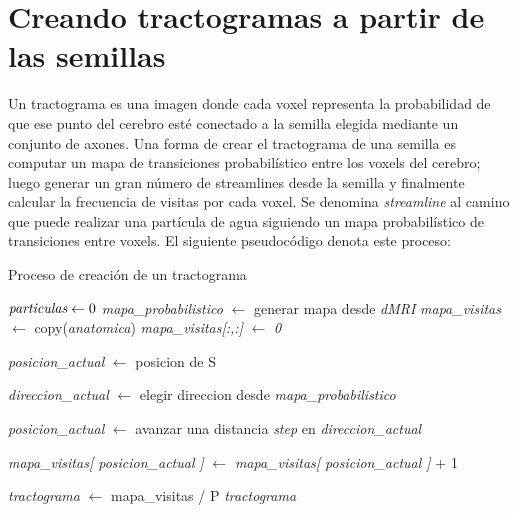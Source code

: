 \section{Creando tractogramas a partir de las semillas}
\label{sec:tractogramas}

Un tractograma es una imagen donde cada voxel representa la probabilidad de que
ese punto del cerebro est\'e conectado a la semilla elegida mediante un conjunto
de axones. Una forma de crear el tractograma de una semilla es computar un mapa 
de transiciones probabil\'istico entre los voxels del cerebro; luego generar un
gran n\'umero de streamlines desde la semilla y finalmente calcular la frecuencia
de visitas por cada voxel. Se denomina \textit{streamline} al camino que puede 
realizar una part\'icula de agua siguiendo un mapa probabil\'is\-tico de transiciones
entre voxels. El siguiente pseudoc\'odigo denota este proceso:\\

\newlength\mylen
\settowidth{}
\addtolength\mylen{\parindent}

\begin{algorithm}
\caption{Proceso de creaci\'on de un tractograma}\label{euclid}
\begin{algorithmic}[1]


\State $\emph{particulas} \gets 0 $
\State \emph{mapa\_probabilistico} $\gets$ generar mapa desde \emph{dMRI} 
\State \emph{mapa\_visitas} $\gets$ copy(\emph{anatomica})
\State \emph{mapa\_visitas[:,:]} $\gets$ \emph{0} 


    \State \emph{posicion\_actual} $\gets$ posicion de S
    

        \State \emph{direccion\_actual} $\gets$ elegir direccion desde \emph{mapa\_probabilistico}
        
        \State \emph{posicion\_actual} $\gets$ avanzar una distancia \emph{step} en \emph{direccion\_actual} 
        
        \State \emph{mapa\_visitas[ posicion\_actual ]} $\gets$ \emph{mapa\_visitas[ posicion\_actual ]} + 1
   
    \EndWhile
\EndWhile

\State \emph{tractograma} $\gets$ mapa\_visitas / P
\State \Return \emph{tractograma} 
 
\EndProcedure
\end{algorithmic}

\end{algorithm}

